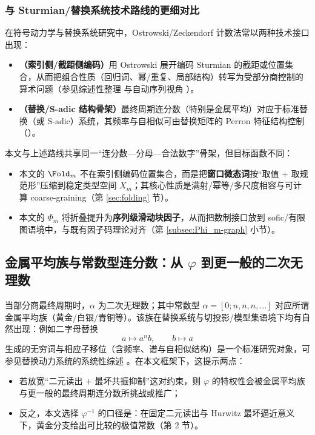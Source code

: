 \subsubsection{与 Sturmian/替换系统技术路线的更细对比}
在符号动力学与替换系统研究中，Ostrowski/Zeckendorf 计数法常以两种技术接口出现：
\begin{itemize}
  \item \textbf{（索引侧/截距侧编码）}用 Ostrowski 展开编码 Sturmian 的截距或位置集合，从而把组合性质（回归词、幂/重复、局部结构）转写为受部分商控制的算术问题（参见综述性整理 \cite{Berthe2001Ostrowski} 与自动序列视角 \cite{AlloucheShallit2003AutomaticSequences}）。
  \item \textbf{（替换/S-adic 结构骨架）}最终周期连分数（特别是金属平均）对应于标准替换（或 S-adic）系统，其频率与自相似可由替换矩阵的 Perron 特征结构控制（\cite{Fogg2002,QueffelecSubstitution}）。
\end{itemize}
本文与上述路线共享同一“连分数—分母—合法数字”骨架，但目标函数不同：
\begin{itemize}
  \item 本文的 $\Fold_m$ 不在索引侧编码位置集合，而是把\textbf{窗口微态词}按“取值 + 取规范形”压缩到稳定类型空间 $X_m$；其核心性质是满射/幂等/多尺度相容与可计算 coarse-graining（第 \ref{sec:folding} 节）。
  \item 本文的 $\Phi_m$ 将折叠提升为\textbf{序列级滑动块因子}，从而把数制接口放到 sofic/有限图语境中，与既有因子码理论对齐（第 \ref{subsec:Phi_m-graph} 小节）。
\end{itemize}

\subsection{金属平均族与常数型连分数：从 \texorpdfstring{$\varphi$}{phi} 到更一般的二次无理数}

当部分商最终周期时，$\alpha$ 为二次无理数；其中常数型 $\alpha=[0;n,n,n,\dots]$ 对应所谓金属平均族（黄金/白银/青铜等）。该族在替换系统与切投影/模型集语境下均有自然出现：例如二字母替换
\[
a\mapsto a^n b,\qquad b\mapsto a
\]
生成的无穷词与相应子移位（含频率、谱与自相似结构）是一个标准研究对象，可参见替换动力系统的系统性综述 \cite{Fogg2002,QueffelecSubstitution}。在本文框架下，这提示两点：
\begin{itemize}
  \item 若放宽“二元读出 + 最坏共振抑制”这对约束，则 $\varphi$ 的特权性会被金属平均族与更一般的最终周期连分数所挑战或推广；
  \item 反之，本文选择 $\varphi^{-1}$ 的口径是：在固定二元读出与 Hurwitz 最坏逼近意义下，黄金分支给出可比较的极值常数（第 2 节）。
\end{itemize}


